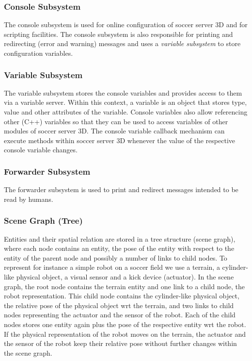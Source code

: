 \documentclass[a4paper,12pt]{article}
\begin{document}
\subsubsection{Console Subsystem}

The console subsystem is used for online configuration of soccer
server 3D and for scripting facilities. %
The console subsystem is also responsible for printing and redirecting
(error and warning) messages and uses a \emph{variable subsystem} to
store configuration variables.


\subsubsection{Variable Subsystem}

The variable subsystem stores the console variables and provides
access to them via a variable server. Within this context, a variable
is an object that stores type, value and other attributes of the
variable.  Console variables also allow referencing other (C++)
variables so that they can be used to access variables of other
modules of soccer server 3D. The console variable callback mechanism
can execute methods within soccer server 3D whenever the value of the
respective console variable changes.

\subsubsection{Forwarder Subsystem}

The forwarder subsystem is used to print and redirect messages
intended to be read by humans.

\subsubsection{Scene Graph (Tree)}
\label{sec:scene_graph}

Entities and their spatial relation are stored in a tree
structure (scene graph), where each node contains an entity, the pose
of the entity with respect to the entity of the parent node and
possibly a number of links to child nodes. To represent for instance a
simple robot on a soccer field we use a terrain, a cylinder-like
physical object, a visual sensor and a kick device (actuator). In the
scene graph, the root node contains the terrain entity and one link to
a child node, the robot representation. This child node contains the
cylinder-like physical object, the relative pose of the physical
object wrt the terrain, and two links to child nodes representing the
actuator and the sensor of the robot. Each of the child nodes stores
one entity again plus the pose of the respective entity wrt the
robot. If the physical representation of the robot moves on the
terrain, the actuator and the sensor of the robot keep their relative
pose without further changes within the scene graph.
\end{document}
